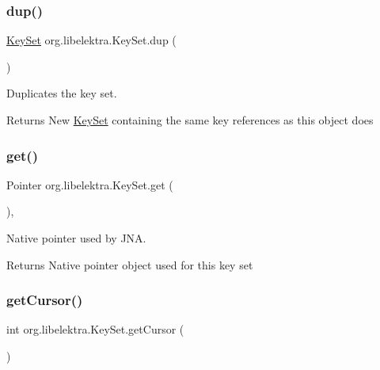 \subsubsection{\texorpdfstring{dup()}{dup()}}
{\footnotesize\ttfamily \hyperlink{classorg_1_1libelektra_1_1KeySet}{Key\+Set} org.\+libelektra.\+Key\+Set.\+dup (\begin{DoxyParamCaption}{ }\end{DoxyParamCaption})\hspace{0.3cm}{\ttfamily [inline]}}



Duplicates the key set. 

\begin{DoxyReturn}{Returns}
New \hyperlink{classorg_1_1libelektra_1_1KeySet}{Key\+Set} containing the same key references as this object does 
\end{DoxyReturn}
\mbox{\label{classorg_1_1libelektra_1_1KeySet_abf3f028c9c3b88a47aa9d67a5c8e95da}} 
\subsubsection{\texorpdfstring{get()}{get()}}
{\footnotesize\ttfamily Pointer org.\+libelektra.\+Key\+Set.\+get (\begin{DoxyParamCaption}{ }\end{DoxyParamCaption})\hspace{0.3cm}{\ttfamily [inline]}, {\ttfamily [protected]}}



Native pointer used by J\+NA. 

\begin{DoxyReturn}{Returns}
Native pointer object used for this key set 
\end{DoxyReturn}
\mbox{\label{classorg_1_1libelektra_1_1KeySet_a37e6d574b4595021a6cc732e325219e1}} 
\subsubsection{\texorpdfstring{get\+Cursor()}{getCursor()}}
{\footnotesize\ttfamily int org.\+libelektra.\+Key\+Set.\+get\+Cursor (\begin{DoxyParamCaption}{ }\end{DoxyParamCaption})\hspace{0.3cm}{\ttfamily [inline]}}



